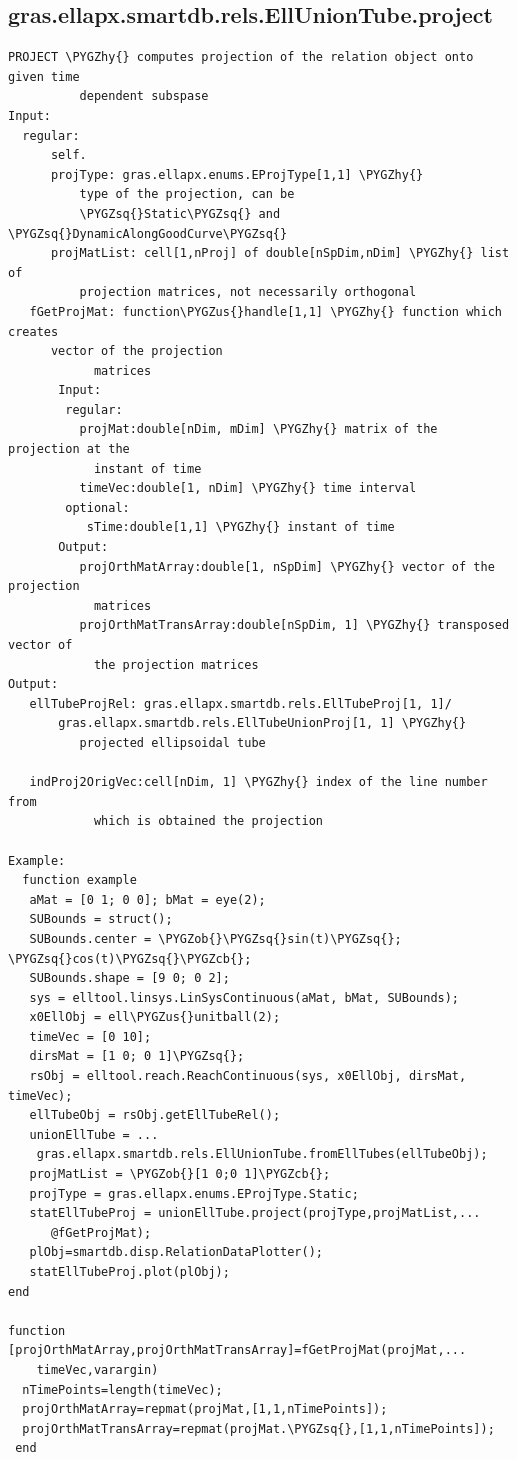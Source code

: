 \documentclass[letterpaper,10pt,english]{sphinxmanual}
\def\PYGZus{\char`\_}
\def\PYGZob{\char`\{}
\def\PYGZcb{\char`\}}
\def\PYGZhy{\char`\-}
\def\PYGZsq{\char`\'}
\begin{document}
\subsection{gras.ellapx.smartdb.rels.EllUnionTube.project}
\label{chap_functions:gras-ellapx-smartdb-rels-elluniontube-project}
\begin{Verbatim}[commandchars=\\\{\}]
PROJECT \PYGZhy{} computes projection of the relation object onto given time
          dependent subspase
Input:
  regular:
      self.
      projType: gras.ellapx.enums.EProjType[1,1] \PYGZhy{}
          type of the projection, can be
          \PYGZsq{}Static\PYGZsq{} and \PYGZsq{}DynamicAlongGoodCurve\PYGZsq{}
      projMatList: cell[1,nProj] of double[nSpDim,nDim] \PYGZhy{} list of
          projection matrices, not necessarily orthogonal
   fGetProjMat: function\PYGZus{}handle[1,1] \PYGZhy{} function which creates
      vector of the projection
            matrices
       Input:
        regular:
          projMat:double[nDim, mDim] \PYGZhy{} matrix of the projection at the
            instant of time
          timeVec:double[1, nDim] \PYGZhy{} time interval
        optional:
           sTime:double[1,1] \PYGZhy{} instant of time
       Output:
          projOrthMatArray:double[1, nSpDim] \PYGZhy{} vector of the projection
            matrices
          projOrthMatTransArray:double[nSpDim, 1] \PYGZhy{} transposed vector of
            the projection matrices
Output:
   ellTubeProjRel: gras.ellapx.smartdb.rels.EllTubeProj[1, 1]/
       gras.ellapx.smartdb.rels.EllTubeUnionProj[1, 1] \PYGZhy{}
          projected ellipsoidal tube

   indProj2OrigVec:cell[nDim, 1] \PYGZhy{} index of the line number from
            which is obtained the projection

Example:
  function example
   aMat = [0 1; 0 0]; bMat = eye(2);
   SUBounds = struct();
   SUBounds.center = \PYGZob{}\PYGZsq{}sin(t)\PYGZsq{}; \PYGZsq{}cos(t)\PYGZsq{}\PYGZcb{};
   SUBounds.shape = [9 0; 0 2];
   sys = elltool.linsys.LinSysContinuous(aMat, bMat, SUBounds);
   x0EllObj = ell\PYGZus{}unitball(2);
   timeVec = [0 10];
   dirsMat = [1 0; 0 1]\PYGZsq{};
   rsObj = elltool.reach.ReachContinuous(sys, x0EllObj, dirsMat, timeVec);
   ellTubeObj = rsObj.getEllTubeRel();
   unionEllTube = ...
    gras.ellapx.smartdb.rels.EllUnionTube.fromEllTubes(ellTubeObj);
   projMatList = \PYGZob{}[1 0;0 1]\PYGZcb{};
   projType = gras.ellapx.enums.EProjType.Static;
   statEllTubeProj = unionEllTube.project(projType,projMatList,...
      @fGetProjMat);
   plObj=smartdb.disp.RelationDataPlotter();
   statEllTubeProj.plot(plObj);
end

function [projOrthMatArray,projOrthMatTransArray]=fGetProjMat(projMat,...
    timeVec,varargin)
  nTimePoints=length(timeVec);
  projOrthMatArray=repmat(projMat,[1,1,nTimePoints]);
  projOrthMatTransArray=repmat(projMat.\PYGZsq{},[1,1,nTimePoints]);
 end
\end{Verbatim}
\end{document}
